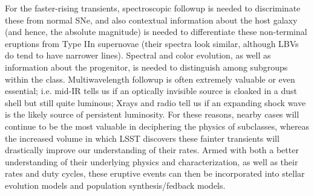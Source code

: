 For the faster-rising transients, spectroscopic followup is needed to
discriminate these from normal SNe, and also contextual information
about the host galaxy (and hence, the absolute magnitude) is needed to
differentiate these non-terminal eruptions from Type IIn supernovae
(their spectra look similar, although LBVs do tend to have narrower
lines).  Spectral and color evolution, as well as information about
the progenitor, is needed to distinguish among subgroups within the
class.  Multiwavelength followup is often extremely valuable or even
essential; i.e. mid-IR tells us if an optically invisible source is
cloaked in a dust shell but still quite luminous; Xrays and radio tell
us if an expanding shock wave is the likely source of persistent
luminosity.  For these reasons, nearby cases will continue to be the
most valuable in deciphering the physics of subclasses, whereas the
increased volume in which LSST discovers these fainter transients will
drastically improve our understanding of their rates.  Armed with both
a better understanding of their underlying physics and
characterization, as well as their rates and duty cycles, these
eruptive events can then be incorporated into stellar evolution models
and population synthesis/fedback models.

%
%
%
%
%
%
%
